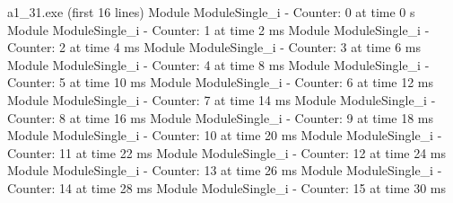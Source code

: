\documentclass[../main.tex]{subfiles}
\begin{document}
\begin{mintedterminal}{a1\_31.exe (first 16 lines)}
Module ModuleSingle_i - Counter: 0 at time 0 s
Module ModuleSingle_i - Counter: 1 at time 2 ms
Module ModuleSingle_i - Counter: 2 at time 4 ms
Module ModuleSingle_i - Counter: 3 at time 6 ms
Module ModuleSingle_i - Counter: 4 at time 8 ms
Module ModuleSingle_i - Counter: 5 at time 10 ms
Module ModuleSingle_i - Counter: 6 at time 12 ms
Module ModuleSingle_i - Counter: 7 at time 14 ms
Module ModuleSingle_i - Counter: 8 at time 16 ms
Module ModuleSingle_i - Counter: 9 at time 18 ms
Module ModuleSingle_i - Counter: 10 at time 20 ms
Module ModuleSingle_i - Counter: 11 at time 22 ms
Module ModuleSingle_i - Counter: 12 at time 24 ms
Module ModuleSingle_i - Counter: 13 at time 26 ms
Module ModuleSingle_i - Counter: 14 at time 28 ms
Module ModuleSingle_i - Counter: 15 at time 30 ms
\end{mintedterminal}
\end{document}
